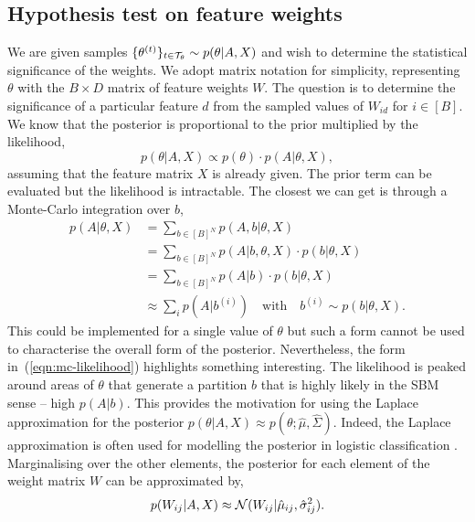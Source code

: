 \subsection{Hypothesis test on feature weights}
\label{appdx:hyp-test}

We are given samples $\{\theta^{(t)}\}_{t \in \mathcal{T}_\theta} \sim p(\theta | A, X)$ and wish to determine the statistical significance of the weights. We adopt matrix notation for simplicity, representing $\theta$ with the $B \times D$ matrix of feature weights $W$. The question is to determine the significance of a particular feature $d$ from the sampled values of $W_{id}$ for $i \in [B]$. We know that the posterior is proportional to the prior multiplied by the likelihood,
%
\begin{equation}
	p(\theta|A, X) \propto p(\theta) \cdot p(A | \theta, X),
\end{equation}
%
assuming that the feature matrix $X$ is already given. The prior term can be evaluated but the likelihood is intractable. The closest we can get is through a Monte-Carlo integration over $b$,
%
\begin{align}
	p(A | \theta, X) &= \sum_{b \in [B]^N} p(A, b | \theta, X) \nonumber \\
	&= \sum_{b \in [B]^N} p(A | b, \theta, X) \cdot p(b | \theta, X) \nonumber \\
	&= \sum_{b \in [B]^N} p(A | b) \cdot p(b | \theta, X) \nonumber \\
	&\approx \sum_{i} p\left( A | b^{(i)} \right) \quad \textrm{with} \quad b^{(i)} \sim p(b| \theta, X).
	\label{eqn:mc-likelihood}
\end{align}
%
This could be implemented for a single value of $\theta$ but such a form cannot be used to characterise the overall form of the posterior. Nevertheless, the form in~(\ref{eqn:mc-likelihood}) highlights something interesting. The likelihood is peaked around areas of $\theta$ that generate a partition $b$ that is highly likely in the SBM sense -- high $p(A|b)$. This provides the motivation for using the Laplace approximation for the posterior $p(\theta | A, X) \approx p(\theta; \hat{\mu}, \hat{\Sigma})$. Indeed, the Laplace approximation is often used for modelling the posterior in logistic classification \cite{laplace}. Marginalising over the other elements, the posterior for each element of the weight matrix $W$ can be approximated by,
%
\begin{equation}
	p(W_{ij}|A, X) \approx \mathcal{N}(W_{ij}|\hat{\mu}_{ij}, \hat{\sigma}_{ij}^2).
\end{equation}
